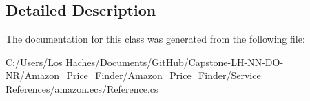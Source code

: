 \subsection{Detailed Description}


The documentation for this class was generated from the following file\-:\begin{DoxyCompactItemize}
\item 
C\-:/\-Users/\-Los Haches/\-Documents/\-Git\-Hub/\-Capstone-\/\-L\-H-\/\-N\-N-\/\-D\-O-\/\-N\-R/\-Amazon\-\_\-\-Price\-\_\-\-Finder/\-Amazon\-\_\-\-Price\-\_\-\-Finder/\-Service References/amazon.\-ecs/Reference.\-cs\end{DoxyCompactItemize}
